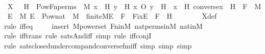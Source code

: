 \begin{isabellebody}
\isanewline
\isanewline
\ \ \isamarkupfalse%
\ {\isachardoublequoteopen}X\ {\isacharequal}{\kern0pt}\ {\isacharbraceleft}{\kern0pt}\ H\ {\isasymin}\ Pow{\isacharparenleft}{\kern0pt}Fn{\isacharunderscore}{\kern0pt}perms{\isacharparenright}{\kern0pt}\ {\isasyminter}\ M{\isachardot}{\kern0pt}\ {\isacharparenleft}{\kern0pt}{\isacharparenleft}{\kern0pt}{\isasymforall}x\ {\isasymin}\ H{\isachardot}{\kern0pt}\ {\isasymforall}y\ {\isasymin}\ H{\isachardot}{\kern0pt}\ x\ O\ y\ {\isasymin}\ H{\isacharparenright}{\kern0pt}\ {\isasymand}\ {\isacharparenleft}{\kern0pt}{\isasymforall}x\ {\isasymin}\ H{\isachardot}{\kern0pt}\ converse{\isacharparenleft}{\kern0pt}x{\isacharparenright}{\kern0pt}\ {\isasymin}\ H{\isacharparenright}{\kern0pt}{\isacharparenright}{\kern0pt}\ {\isasymand}\ {\isacharparenleft}{\kern0pt}{\isasymexists}F\ {\isasymin}\ M{\isachardot}{\kern0pt}\ {\isasymexists}E\ {\isasymin}\ M{\isachardot}{\kern0pt}\ E\ {\isasymin}\ Pow{\isacharparenleft}{\kern0pt}nat{\isacharparenright}{\kern0pt}\ {\isasyminter}\ M\ {\isasymand}\ finite{\isacharunderscore}{\kern0pt}M{\isacharparenleft}{\kern0pt}E{\isacharparenright}{\kern0pt}\ {\isasymand}\ F\ {\isacharequal}{\kern0pt}\ Fix{\isacharparenleft}{\kern0pt}E{\isacharparenright}{\kern0pt}\ {\isasymand}\ F\ {\isasymsubseteq}\ H{\isacharparenright}{\kern0pt}\ {\isacharbraceright}{\kern0pt}{\isachardoublequoteclose}\ \isanewline
\ \ \ \ \isamarkupfalse%
\ X{\isacharunderscore}{\kern0pt}def\isanewline
\ \ \ \ \isamarkupfalse%
{\isacharparenleft}{\kern0pt}rule\ iff{\isacharunderscore}{\kern0pt}eq{\isacharparenright}{\kern0pt}\isanewline
\ \ \ \ \isamarkupfalse%
{\isacharparenleft}{\kern0pt}insert\ M{\isacharunderscore}{\kern0pt}powerset\ Fn{\isacharunderscore}{\kern0pt}in{\isacharunderscore}{\kern0pt}M\ nat{\isacharunderscore}{\kern0pt}perms{\isacharunderscore}{\kern0pt}in{\isacharunderscore}{\kern0pt}M\ nat{\isacharunderscore}{\kern0pt}in{\isacharunderscore}{\kern0pt}M{\isacharparenright}{\kern0pt}\isanewline
\ \ \ \ \isamarkupfalse%
{\isacharparenleft}{\kern0pt}rule\ iff{\isacharunderscore}{\kern0pt}trans{\isacharcomma}{\kern0pt}\ rule\ sats{\isacharunderscore}{\kern0pt}And{\isacharunderscore}{\kern0pt}iff{\isacharcomma}{\kern0pt}\ simp{\isacharcomma}{\kern0pt}\ rule\ iff{\isacharunderscore}{\kern0pt}conjI{\isacharparenright}{\kern0pt}\isanewline
\ \ \ \ \ \isamarkupfalse%
{\isacharparenleft}{\kern0pt}rule\ sats{\isacharunderscore}{\kern0pt}closed{\isacharunderscore}{\kern0pt}under{\isacharunderscore}{\kern0pt}comp{\isacharunderscore}{\kern0pt}and{\isacharunderscore}{\kern0pt}converse{\isacharunderscore}{\kern0pt}fm{\isacharunderscore}{\kern0pt}iff{\isacharcomma}{\kern0pt}\ simp{\isacharcomma}{\kern0pt}\ simp{\isacharcomma}{\kern0pt}\ simp{\isacharparenright}{\kern0pt}\isanewline

\end{isabellebody}
